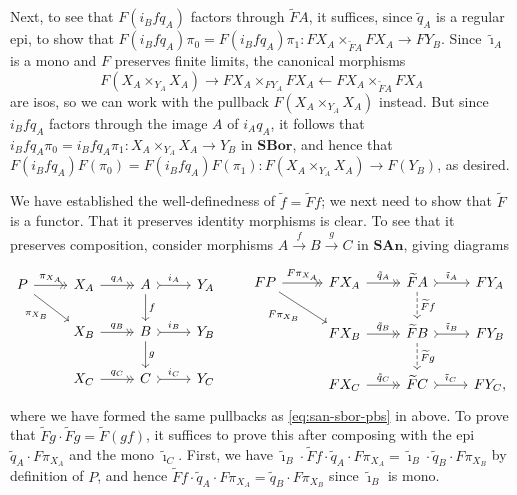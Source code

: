 \documentclass[11pt]{amsart}
\newcommand\ot{\leftarrow}
\newcommand\SAn{\mathbf{SAn}}
\newcommand\SBor{\mathbf{SBor}}
\newcommand\tildei{\tilde\imath}
\newcommand\tox[2][]{\xrightarrow[#1]{#2}}
\newcommand\wt[1]{\widetilde{#1}}
\theoremstyle{definition}
\theoremstyle{remark}
\theoremstyle{plain}
\begin{document}
Next, to see that \(  F(i_B f q_A) \) factors through \( \wt F A \), it suffices, since \( \tilde q_A \) is a regular epi, to show that \( F(i_B f q_A) \pi_0 = F(i_B f q_A) \pi_1 \colon F X_A \times_{\wt F A} F X_A \to F Y_B \).
Since \( \tildei_A \) is a mono and \( F \) preserves finite limits, the canonical morphisms
\[
  F(X_A \times_{Y_A} X_A) \to F X_A \times_{F Y_A} F X_A \ot F X_A \times_{\wt F A} F X_A
\]
are isos, so we can work with the pullback \( F(X_A \times_{Y_A} X_A) \) instead.
But since \( i_B f q_A \) factors through the image \( A \) of \( i_A q_A \), it follows that \( i_B f q_A \pi_0 = i_B f q_A \pi_1 \colon X_A \times_{Y_A} X_A \to Y_B \) in \( \SBor \), and hence that \( F(i_B f q_A) F(\pi_0) = F(i_B f q_A) F(\pi_1) \colon F(X_A \times_{Y_A} X_A) \to F(Y_B) \), as desired.

We have established the well-definedness of \( \tilde f = \wt F f \); we next need to show that \( \wt F \) is a functor.
That it preserves identity morphisms is clear.
To see that it preserves composition, consider morphisms \( A \tox{f} B \tox{g} C \) in \( \SAn \), giving diagrams
\[
  \begin{tikzcd}
    P \ar[r, "\pi_{X_A}", ->>] \ar[rd, "\pi_{X_B}"'] & X_A \ar[r, "q_A", ->>] & A \ar[r, "i_A", >->] \ar[d, "f"] & Y_A \\
    & X_B \ar[r, "q_B", ->>] & B \ar[r, "i_B", >->] \ar[d, "g"] & Y_B \\
    & X_C \ar[r, "q_C", ->>] & C \ar[r, "i_C", >->] & Y_C
  \end{tikzcd}
  \qquad
  \begin{tikzcd}
    F P \ar[r, "F \pi_{X_A}", ->>] \ar[rd, "F \pi_{X_B}"'] &[5pt] F X_A \ar[r, "\tilde q_A", ->>] & \wt F A \ar[r, "\tildei_A", >->] \ar[d, "\wt F f", dashed] & F Y_A \\
    & F X_B \ar[r, "\tilde q_B", ->>] & \wt F B \ar[r, "\tildei_B", >->] \ar[d, "\wt F g", dashed] & F Y_B \\
    & F X_C \ar[r, "\tilde q_C", ->>] & \wt F C \ar[r, "\tildei_C", >->] & F Y_C,
  \end{tikzcd}
\]
where we have formed the same pullbacks as \eqref{eq:san-sbor-pbs} in above.
To prove that \( \wt F g \cdot \wt F g = \wt F(g f) \), it suffices to prove this after composing with the epi \( \tilde q_A \cdot F \pi_{X_A} \) and the mono \( \tildei_C \).
First, we have \( \tildei_B \cdot \wt F f \cdot \tilde q_A \cdot F \pi_{X_A} = \tildei_B \cdot \tilde q_B \cdot F \pi_{X_B} \) by definition of \( P \), and hence  \( \wt F f \cdot \tilde q_A \cdot F \pi_{X_A} = \tilde q_B \cdot F \pi_{X_B} \) since \( \tildei_B \) is mono.
\end{document}

